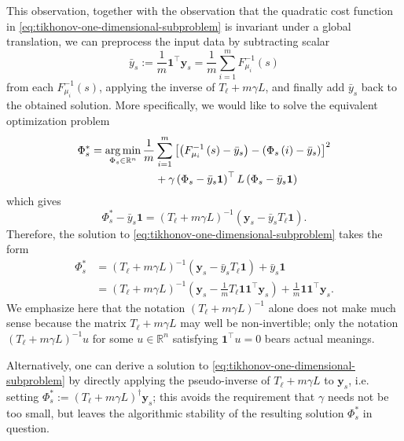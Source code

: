 \documentclass[letterpaper]{article} %
\begin{document}
This observation, together with the observation that the quadratic cost function in \eqref{eq:tikhonov-one-dimensional-subproblem} is invariant under a global translation, we can preprocess the input data by subtracting scalar
\begin{equation}
  \label{eq:off-set-defn}
  \bar{y}_s := \frac{1}{m}\mathbf{1}^{\top}\mathbf{y}_s=\frac{1}{m}\sum_{i=1}^mF_{\mu_i}^{-1}\left( s \right)
\end{equation}
from each $F_{\mu_i}^{-1}\left( s \right)$, applying the inverse of $T_\ell+m\gamma L$, and finally add $\bar{y}_s$ back to the obtained solution. More specifically, we would like to solve the equivalent optimization problem
\begin{equation}
  \label{eq:tikhonov-one-dimensional-subproblem-equiv}
  \begin{aligned}
    \Phi_s^*=\mathop{\rm arg\, min}_{\Phi_s\in\mathbb{R}^n}\frac{1}{m}&\sum_{i=1}^m \left[\left( F_{\mu_i}^{-1}\left( s \right)-\bar{y}_s\right)-\left(\Phi_s \left( i \right)-\bar{y}_s \right)\right]^2\\
    &+\gamma \left(\Phi_s-\bar{y}_s\mathbf{1}\right)^{\top}L\left(\Phi_s-\bar{y}_s\mathbf{1}\right)
  \end{aligned}
\end{equation}
which gives
\begin{equation*}
  \Phi_s^*-\bar{y}_s\mathbf{1}=\left( T_{\ell}+m\gamma L \right)^{-1}\left(\mathbf{y}_s-\bar{y}_sT_\ell\mathbf{1}\right).
\end{equation*}
Therefore, the solution to \eqref{eq:tikhonov-one-dimensional-subproblem} takes the form
\begin{equation}
  \label{eq:sol-tikhonov-one-dimensional-subproblem}
  \begin{aligned}
    \Phi_s^{*}&=\left( T_{\ell}+m\gamma L \right)^{-1}\left(\mathbf{y}_s-\bar{y}_sT_\ell\mathbf{1}\right)+\bar{y}_s\mathbf{1}\\
    &=\left( T_{\ell}+m\gamma L \right)^{-1}\left(\mathbf{y}_s-\frac{1}{m} T_\ell\mathbf{1}\mathbf{1}^{\top}\mathbf{y}_s\right)+\frac{1}{m}\mathbf{1}\mathbf{1}^{\top}\mathbf{y}_s.
  \end{aligned}
\end{equation}
We emphasize here that the notation $\left( T_{\ell}+m\gamma L \right)^{-1}$ alone does not make much sense because the matrix $T_{\ell}+m\gamma L$ may well be non-invertible; only the notation $\left( T_{\ell}+m\gamma L \right)^{-1}u$ for some $u\in\mathbb{R}^n$ satisfying $\mathbf{1}^{\top}u=0$ bears actual meanings.
\begin{remark}
  Alternatively, one can derive a solution to \eqref{eq:tikhonov-one-dimensional-subproblem} by directly applying the pseudo-inverse of $T_{\ell}+m\gamma L$ to $\mathbf{y}_s$, i.e. setting $\Phi_s^{*}:=\left( T_{\ell}+m\gamma L \right)^{\dagger}\mathbf{y}_s$; this avoids the requirement that $\gamma$ needs not be too small, but leaves the algorithmic stability of the resulting solution $\Phi_s^{*}$ in question.
\end{remark}
\end{document}

